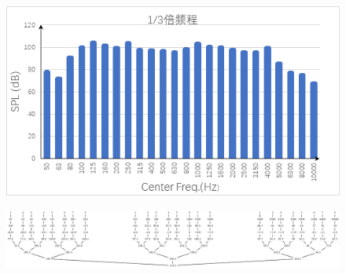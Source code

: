 \documentclass[a4paper]{article}
\begin{document}
	\begin{figure}
		\centering
		\includegraphics{d.png}
	\end{figure}
	\begin{figure}
		\centering
		\includegraphics[width=18cm]{c.pdf}
	\end{figure}
\end{document}
